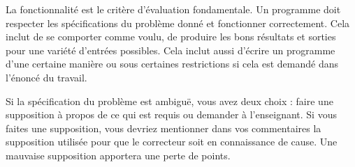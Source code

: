 La fonctionnalité est le critère d'évaluation fondamentale. Un programme doit respecter les spécifications du problème donné et fonctionner correctement. Cela inclut de se comporter comme voulu, de produire les bons résultats et sorties pour une variété d'entrées possibles. Cela inclut aussi d'écrire un programme d'une certaine manière ou sous certaines restrictions si cela est demandé dans l'énoncé du travail.

Si la spécification du problème est ambiguë, vous avez deux choix : faire une supposition à propos de ce qui est requis ou demander à l'enseignant. Si vous faites une supposition, vous devriez mentionner dans vos commentaires la supposition utilisée pour que le correcteur soit en connaissance de cause. Une mauvaise supposition apportera une perte de points.
